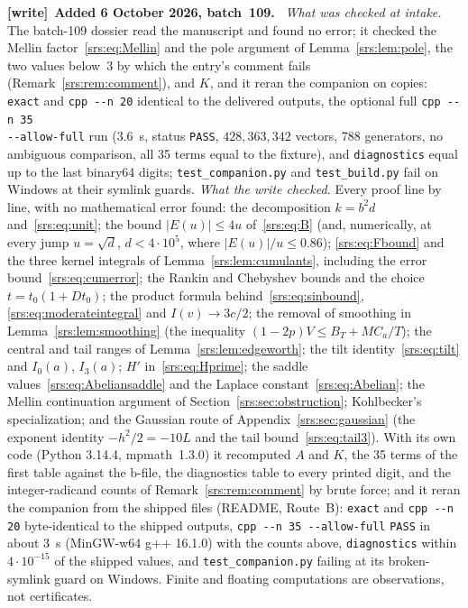 \documentclass[11pt]{article}
\numberwithin{equation}{section}
\theoremstyle{remark}\newtheorem{remark}[theorem]{Remark}
\newcommand{\file}[1]{\nolinkurl{#1}}
\newenvironment{writenote}[1][]{\par\smallskip\begingroup\small
 \noindent\textbf{[write]}\if\relax\detokenize{#1}\relax\else~\textbf{#1.}\fi\ }%
 {\par\endgroup\smallskip}
\begin{document}
\begin{writenote}[Added 6 October 2026, batch~109]
\emph{What was checked at intake.} The batch-109 dossier read the manuscript
and found no error; it checked the Mellin factor~\eqref{srs:eq:Mellin} and
the pole argument of Lemma~\ref{srs:lem:pole}, the two values below~$3$ by
which the entry's comment fails (Remark~\ref{srs:rem:comment}), and $K$, and
it reran the companion on copies: \file{exact} and \file{cpp --n 20}
identical to the delivered outputs, the optional full \file{cpp --n 35
--allow-full} run (3.6~s, status \file{PASS}, $428{,}363{,}342$ vectors, 788
generators, no ambiguous comparison, all 35 terms equal to the fixture), and
\file{diagnostics} equal up to the last binary64 digits; \file{test\_companion.py}
and \file{test\_build.py} fail on Windows at their symlink guards.
\emph{What the write checked.} Every proof line by line, with no
mathematical error found: the decomposition $k=b^2d$ and~\eqref{srs:eq:unit};
the bound $|E(u)|\le4u$ of~\eqref{srs:eq:B} (and, numerically, at every jump
$u=\sqrt d$, $d<4\cdot10^5$, where $|E(u)|/u\le0.86$); \eqref{srs:eq:Fbound}
and the three kernel integrals of Lemma~\ref{srs:lem:cumulants}, including
the error bound~\eqref{srs:eq:cumerror}; the Rankin and Chebyshev bounds and
the choice $t=t_0(1+Dt_0)$; the product formula behind~\eqref{srs:eq:sinbound},
\eqref{srs:eq:moderateintegral} and $I(v)\to3c/2$; the removal of smoothing
in Lemma~\ref{srs:lem:smoothing} (the inequality
$(1-2p)V\le B_T+MC_a/T$); the central and tail ranges of
Lemma~\ref{srs:lem:edgeworth}; the tilt identity~\eqref{srs:eq:tilt} and
$I_0(a)$, $I_3(a)$; $H'$ in~\eqref{srs:eq:Hprime}; the saddle
values~\eqref{srs:eq:Abeliansaddle} and the Laplace
constant~\eqref{srs:eq:Abelian}; the Mellin continuation argument
of Section~\ref{srs:sec:obstruction}; Kohlbecker's specialization; and the
Gaussian route of Appendix~\ref{srs:sec:gaussian} (the exponent identity
$-h^2/2=-10L$ and the tail bound~\eqref{srs:eq:tail3}). With its own code
(Python 3.14.4, mpmath~1.3.0) it recomputed $A$ and $K$, the 35 terms of
the first table against the b-file, the diagnostics table to every printed
digit, and the integer-radicand counts of Remark~\ref{srs:rem:comment} by
brute force; and it reran the companion from the shipped files (README,
Route~B): \file{exact} and \file{cpp --n 20} byte-identical to the shipped
outputs, \file{cpp --n 35 --allow-full} \file{PASS} in about 3~s (MinGW-w64
g++ 16.1.0) with the counts above, \file{diagnostics} within
$4\cdot10^{-15}$ of the shipped values, and \file{test\_companion.py} failing
at its broken-symlink guard on Windows. Finite and floating computations are
observations, not certificates.


\end{writenote}
\end{document}
